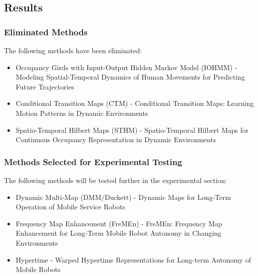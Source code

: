   \subsection{ Results }
  \subsubsection{ Eliminated Methods }
  The following methods have been eliminated:
  \begin{itemize}
    \item Occupancy Girds with Input-Output Hidden Markov Model (IOHMM) - Modeling Spatial-Temporal Dynamics of Human Movements for Predicting Future Trajectories \cite{Wang2015}
    \item Conditional Transition Maps (CTM) - Conditional Transition Maps: Learning Motion Patterns in Dynamic Environments \cite{Kucner2013}
    \item Spatio-Temporal Hilbert Maps (STHM) - Spatio-Temporal Hilbert Maps for Continuous Occupancy Representation in Dynamic Environments \cite{Senanayake2016}
  \end{itemize}

  \subsubsection{ Methods Selected for Experimental Testing }
  The following methods will be tested further in the experimental section:
  \begin{itemize}
    \item Dynamic Multi-Map (DMM/Duckett) - Dynamic Maps for Long-Term Operation of Mobile Service Robots \cite{biber2005}
    \item Frequency Map Enhancement (FreMEn) - FreMEn: Frequency Map Enhancement for Long-Term Mobile Robot Autonomy in Changing Environments \cite{Krajnik2015}
    \item Hypertime - Warped Hypertime Representations for Long-term Autonomy of Mobile Robots \cite{Kranjik2018}
  \end{itemize}


